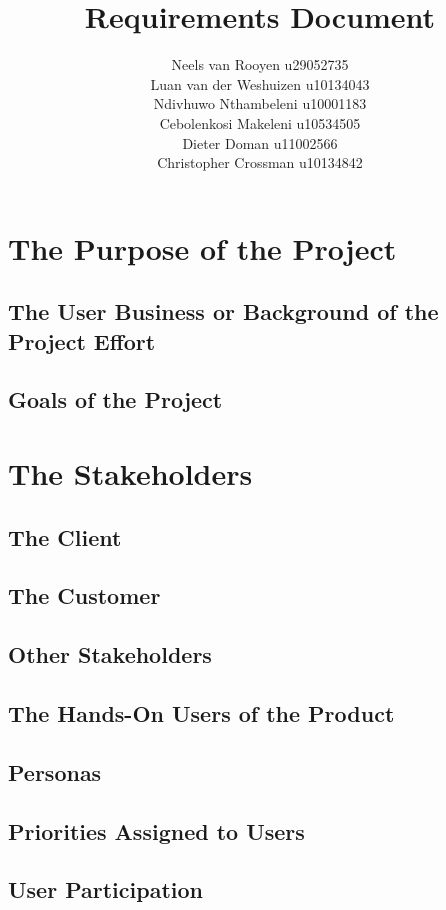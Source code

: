 \documentclass[12pt,a4paper]{article}
\begin{document}
\title{Requirements Document}
\author{Neels van Rooyen u29052735\\
Luan van der Weshuizen u10134043\\
Ndivhuwo Nthambeleni u10001183\\
Cebolenkosi Makeleni u10534505\\
Dieter Doman u11002566\\
Christopher Crossman u10134842}
\maketitle
\pagebreak
\section{The Purpose of the Project}
\subsection{The User Business or Background of the Project Effort}
\subsection{Goals of the Project}
\pagebreak
\section{The Stakeholders}
\subsection{The Client}
\subsection{The Customer}
\subsection{Other Stakeholders}
\subsection{The Hands-On Users of the Product}
\subsection{Personas}
\subsection{Priorities Assigned to Users}
\subsection{User Participation}
\end{document}
